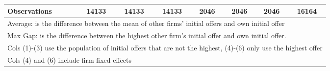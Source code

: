 {\begin{tabular}{l*{7}{c}}
\hline
Observations        &       14133         &       14133         &       14133         &        2046         &        2046         &        2046         &       16164         \\
\hline\hline
\multicolumn{8}{l}{\footnotesize Average: is the difference between the mean of other firms' initial offers and own initial offer}\\
\multicolumn{8}{l}{\footnotesize Max Gap: is the difference between the highest other firm's initial offer and own initial offer.}\\
\multicolumn{8}{l}{\footnotesize Cols (1)-(3) use the population of initial offers that are not the highest, (4)-(6) only use the highest offer}\\
\multicolumn{8}{l}{\footnotesize Cols (4) and (6) include firm fixed effects}\\
\end{tabular}
}
